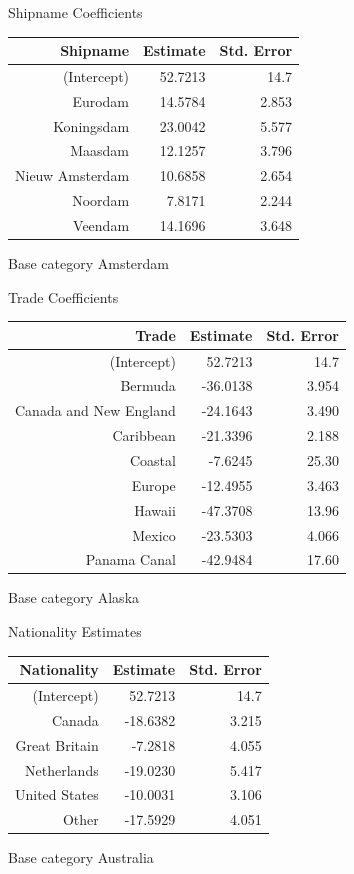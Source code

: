 \documentclass[table]{beamer}
\begin{document}
\begin{frame}{Shipname Coefficients}
	\begin{table}
		\centering 
		\begin{tabular}{r|r r }
			Shipname & Estimate & Std. Error \\ 
			\hline 
			(Intercept) & 52.7213 & 14.7  \\
			Eurodam & 14.5784 & 2.853 \\
			Koningsdam & 23.0042 & 5.577 \\
			Maasdam & 12.1257 & 3.796  \\
			Nieuw Amsterdam & 10.6858 & 2.654 \\
			Noordam & 7.8171 & 2.244 \\
			Veendam & 14.1696 & 3.648 \\
		\end{tabular}
	\end{table}
	Base category Amsterdam
\end{frame}

\begin{frame}{Trade Coefficients}
	\begin{table}
		\centering
		\begin{tabular}{r|rr}
			Trade & Estimate & Std. Error \\ 
			\hline 
			(Intercept) & 52.7213 & 14.7  \\
			Bermuda & -36.0138 & 3.954 \\
			Canada and New England & -24.1643 & 3.490 \\
			Caribbean & -21.3396 & 2.188 \\
			Coastal & -7.6245 & 25.30 \\
			Europe & -12.4955 & 3.463 \\
			Hawaii & -47.3708 & 13.96 \\
			Mexico & -23.5303 & 4.066 \\
			Panama Canal & -42.9484 & 17.60 \\
		\end{tabular}
	\end{table}
	Base category Alaska
\end{frame}

\begin{frame}{Nationality Estimates}
	\begin{table}
		\centering 
	\begin{tabular}{r|rr}
		Nationality & Estimate & Std. Error \\
		\hline 
		(Intercept) & 52.7213 & 14.7  \\
		Canada & -18.6382 & 3.215 \\
		Great Britain & -7.2818 & 4.055 \\
		Netherlands & -19.0230 & 5.417 \\
		United States & -10.0031 & 3.106 \\
		Other & -17.5929 & 4.051 \\
	\end{tabular}
\end{table}
Base category Australia
\end{frame}
\end{document}
